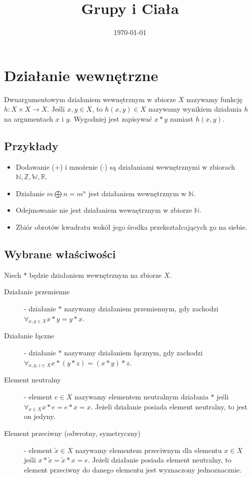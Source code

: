 \documentclass{article}
\title{Grupy i Ciała}
\date{\today}
\begin{document}
\maketitle

\section{Działanie wewnętrzne}
Dwuargumentowym działaniem wewnętrznym w zbiorze $X$ nazywamy funkcję $h : X \times X \rightarrow X$.
Jeśli $x, y \in X$, to $h(x, y) \in X$ nazywamy wynikiem działania $h$ na argumentach $x$ i $y$.
Wygodniej jest zapisywać $x * y$ zamiast $h(x, y)$.

\subsection{Przykłady}
\begin{itemize}
    \item Dodawanie ($+$) i mnożenie ($\cdot$) są działaniami wewnętrznymi w zbiorach $\mathbb{N}, \mathbb{Z}, \mathbb{W}, \mathbb{R}$.
    \item Działanie $m \bigoplus n = m^n$ jest działaniem wewnętrznym w $\mathbb{N}$.
    \item Odejmowanie nie jest działaniem wewnętrznym w zbiorze $\mathbb{N}$.
    \item Zbiór obrotów kwadratu wokół jego środka przekształcających go na siebie.
\end{itemize}

\subsection{Wybrane właściwości}
Niech $*$ będzie działaniem wewnętrznym na zbiorze $X$.
\begin{description}
    \item[Działanie przemienne] - działanie $*$ nazywamy działaniem przemiennym, gdy zachodzi $\forall_{x,y \in X} x * y = y * x$.
    \item[Działanie łączne] - działanie $*$ nazywamy działaniem łącznym, gdy zachodzi $\forall_{x,y,z \in X} x * (y * z) = (x * y) * z$.
    \item[Element neutralny] - element $e \in X$ nazywamy elementem neutralnym działania $*$ jeśli $\forall_{x \in X} x * e = e * x = x$. Jeżeli działanie posiada element neutralny, to jest on jedyny.
    \item[Element przeciwny (odwrotny, symetryczny)] - element $\tilde{x} \in X$ nazywamy elementem przeciwnym dla elementu $x \in X$ jeśli $x * \tilde{x} = \tilde{x} * x = e$.
Jeżeli działanie posiada element neutralny, to element przeciwny do danego elementu jest wyznaczony jednoznacznie.
\end{description}
\end{document}
